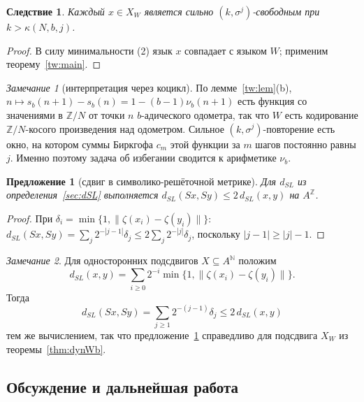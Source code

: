 \documentclass[a4paper,14pt]{extreport}
\theoremstyle{plain}
\newtheorem{proposition}[theorem]{Предложение}
\newtheorem{corollary}[theorem]{Следствие}
\theoremstyle{definition}
\theoremstyle{remark}
\newtheorem{remark}{Замечание}
\begin{document}
\begin{corollary}
	Каждый $x\in X_W$ является сильно $(k,\sigma^j)$-свободным при $k>\kappa(N,b,j)$.
\end{corollary}
\begin{proof}
	В силу минимальности (2) язык $x$ совпадает с языком $W$; применим теорему~\ref{tw:main}.
\end{proof}

\begin{remark}[интерпретация через коцикл]
	По лемме~\ref{tw:lem}(b), $n\mapsto s_b(n+1)-s_b(n)=1-(b-1)\nu_b(n+1)$ есть функция со значениями в $\mathbb Z/N$ от точки
	$n$ $b$-адического одометра, так что $W$ есть кодирование $\mathbb Z/N$-косого произведения над одометром. Сильное
	$(k,\sigma^j)$-повторение есть окно, на котором суммы Биркгофа $c_m$ этой функции за $m$ шагов постоянно равны $j$.
	Именно поэтому задача об избегании сводится к арифметике $\nu_b$.
\end{remark}

\begin{proposition}[сдвиг в символико-решёточной метрике]\label{prop:dSLshift}
	Для $d_{SL}$ из определения~\ref{sec:dSL} выполняется $d_{SL}(Sx,Sy)\le2\,d_{SL}(x,y)$ на $A^{\mathbb Z}$.
\end{proposition}
\begin{proof}
	При $\delta_i=\min\{1,\|\zeta(x_i)-\zeta(y_i)\|\}$:
	$d_{SL}(Sx,Sy)=\sum_j2^{-|j-1|}\delta_j\le2\sum_j2^{-|j|}\delta_j$, поскольку $|j-1|\ge|j|-1$.
\end{proof}

\begin{remark}
	Для односторонних подсдвигов $X\subseteq A^{\mathbb N}$ положим
	\begin{equation}
		d_{SL}(x,y)=\sum_{i\ge0}2^{-i}\min\{1,\|\zeta(x_i)-\zeta(y_i)\|\}.
	\end{equation}
	Тогда
	\begin{equation}
		d_{SL}(Sx,Sy)=\sum_{j\ge1}2^{-(j-1)}\delta_j\le2\,d_{SL}(x,y)
	\end{equation}
	тем же вычислением, так что предложение~\ref{prop:dSLshift} справедливо для подсдвига $X_W$ из теоремы~\ref{thm:dynWb}.
\end{remark}

\subsection{Обсуждение и дальнейшая работа}
\end{document}
